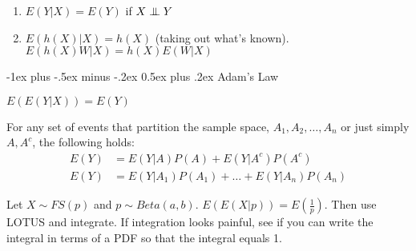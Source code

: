 \documentclass[10pt,landscape]{article}
\makeatletter
\theoremstyle{definition}
\newcommand\independent{\protect\mathpalette{\protect\independenT}{\perp}}
\def\independenT#1#2{\mathrel{\setbox0\hbox{$#1#2$}%
    \copy0\kern-\wd0\mkern4mu\box0}}
\renewcommand{\section}{\@startsection{section}{1}{0mm}%
                                {-1ex plus -.5ex minus -.2ex}%
                                {0.5ex plus .2ex}%
                                {\normalfont\large\bfseries}}
\makeatother
\begin{document}
\begin{multicols}{3}
\begin{description}
\begin{comment}
    \item[Conditioning on a Random Variable] - We can also find the expected value of $Y$ given the random variable $X$. The resulting expectation, $E(Y|X)$ is \emph{not a number but a function of the random variable X}. For an easy way to find $E(Y|X)$, find $E(Y|X = x)$ and then plug in $X$ for all $x$. This changes the conditional expectation of $Y$ from a function of a number $x$, to a function of the random variable $X$.
\end{comment}
    \item[Properties of Conditioning on Random Variables] \quad
    \begin{enumerate}
        \item $E(Y|X) = E(Y)$ if $X \independent Y$
        \item $E(h(X)|X) = h(X)$ (taking out what's known). \\
            $E(h(X)W|X) = h(X)E(W|X)$
        
    \end{enumerate}
\end{description}
\section{Adam's Law}
\begin{description}
	\item$E(E(Y|X)) = E(Y)$
	\item For any set of events that partition the sample space, $A_1, A_2, \dots, A_n$ or just simply $A, A^c$, the following holds:
    \begin{align*}
        E(Y) &= E(Y|A)P(A) + E(Y|A^c)P(A^c) \\
        E(Y) &= E(Y|A_1)P(A_1) + \dots + E(Y|A_n)P(A_n)
    \end{align*}
    \item[Example] Let $X\sim FS(p)$ and $p \sim Beta(a,b)$. $E(E(X|p))=E(\frac{1}{p})$. Then use LOTUS and integrate. If integration looks painful, see if you can write the integral in terms of a PDF so that the integral equals 1. 
\end{description}
\begin{comment}

\end{comment}
\end{multicols}
\end{document}

